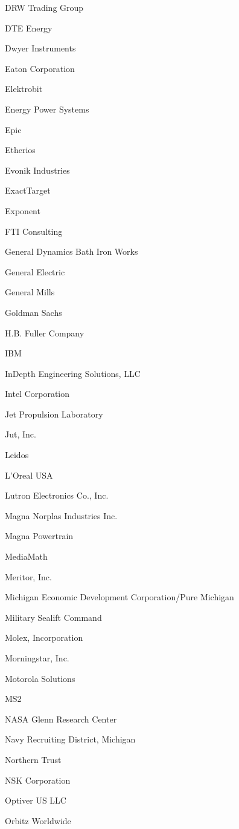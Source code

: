 \documentclass[twoside]{article}
\begin{document}
\begin{center}
\begin{multicols}{5}
\begin{FlushLeft}
\begin{compactitem}
\item DRW Trading Group
\item DTE Energy
\item Dwyer Instruments
\item Eaton Corporation
\item Elektrobit
\item Energy Power Systems
\item Epic
\item Etherios
\item Evonik Industries
\item ExactTarget
\item Exponent
\item FTI Consulting
\item General Dynamics Bath Iron Works
\item General Electric
\item General Mills
\item Goldman Sachs
\item H.B. Fuller Company
\item IBM
\item InDepth Engineering Solutions, LLC
\item Intel Corporation
\item Jet Propulsion Laboratory
\item Jut, Inc.
\item Leidos
\item L'Oreal USA
\item Lutron Electronics Co., Inc.
\item Magna Norplas Industries Inc.
\item Magna Powertrain
\item MediaMath
\item Meritor, Inc.
\item Michigan Economic Development Corporation/Pure Michigan
\item Military Sealift Command
\item Molex, Incorporation
\item Morningstar, Inc.
\item Motorola Solutions
\item MS2
\item NASA Glenn Research Center
\item Navy Recruiting District, Michigan
\item Northern Trust
\item NSK Corporation
\item Optiver US LLC
\item Orbitz Worldwide

\end{compactitem}
\end{FlushLeft}
\end{multicols}
\end{center}
\end{document}
